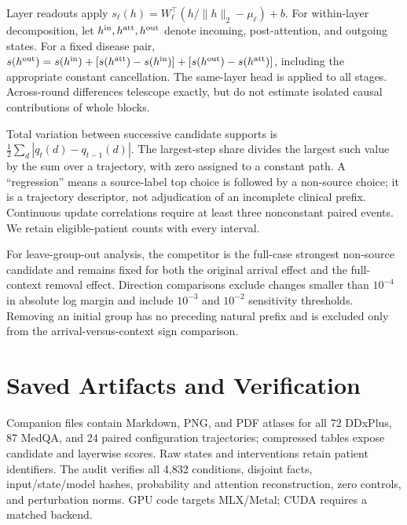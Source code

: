 \documentclass[11pt]{article}
\begin{document}
Layer readouts apply $s_\ell(h)=W_\ell^\top(h/\|h\|_2-\mu_\ell)+b$. For within-layer decomposition, let $h^{\rm in},h^{\rm att},h^{\rm out}$ denote incoming, post-attention, and outgoing states. For a fixed disease pair, $s(h^{\rm out})=s(h^{\rm in})+[s(h^{\rm att})-s(h^{\rm in})]+[s(h^{\rm out})-s(h^{\rm att})]$, including the appropriate constant cancellation. The same-layer head is applied to all stages. Across-round differences telescope exactly, but do not estimate isolated causal contributions of whole blocks.

Total variation between successive candidate supports is $\frac12\sum_d|q_t(d)-q_{t-1}(d)|$. The largest-step share divides the largest such value by the sum over a trajectory, with zero assigned to a constant path. A ``regression'' means a source-label top choice is followed by a non-source choice; it is a trajectory descriptor, not adjudication of an incomplete clinical prefix. Continuous update correlations require at least three nonconstant paired events. We retain eligible-patient counts with every interval.

For leave-group-out analysis, the competitor is the full-case strongest non-source candidate and remains fixed for both the original arrival effect and the full-context removal effect. Direction comparisons exclude changes smaller than $10^{-4}$ in absolute log margin and include $10^{-3}$ and $10^{-2}$ sensitivity thresholds. Removing an initial group has no preceding natural prefix and is excluded only from the arrival-versus-context sign comparison.

\section{Saved Artifacts and Verification}
Companion files contain Markdown, PNG, and PDF atlases for all 72 DDxPlus, 87 MedQA, and 24 paired configuration trajectories; compressed tables expose candidate and layerwise scores. Raw states and interventions retain patient identifiers. The audit verifies all 4,832 conditions, disjoint facts, input/state/model hashes, probability and attention reconstruction, zero controls, and perturbation norms. GPU code targets MLX/Metal; CUDA requires a matched backend.
\end{document}

